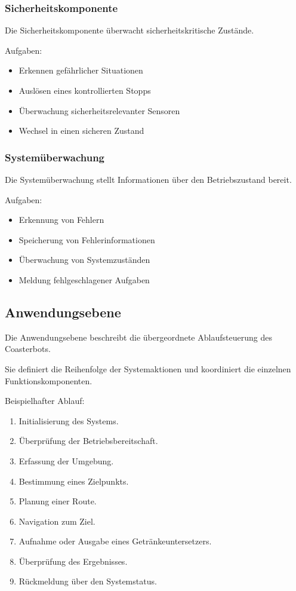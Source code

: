 \documentclass[
  a4paper,
  12pt,
  DIV=12,        %
  parskip=half,  %
  headings=small %
]{scrartcl}
\theoremstyle{definition}
\providecommand{\tightlist}{%
  \setlength{\itemsep}{0pt}\setlength{\parskip}{0pt}}
\theoremstyle{definition}
\begin{document}
\subsubsection{Sicherheitskomponente}\label{sicherheitskomponente}

Die Sicherheitskomponente überwacht sicherheitskritische Zustände.

Aufgaben:

\begin{itemize}
\tightlist
\item
  Erkennen gefährlicher Situationen
\item
  Auslösen eines kontrollierten Stopps
\item
  Überwachung sicherheitsrelevanter Sensoren
\item
  Wechsel in einen sicheren Zustand
\end{itemize}

\subsubsection{Systemüberwachung}\label{systemuxfcberwachung}

Die Systemüberwachung stellt Informationen über den Betriebszustand
bereit.

Aufgaben:

\begin{itemize}
\tightlist
\item
  Erkennung von Fehlern
\item
  Speicherung von Fehlerinformationen
\item
  Überwachung von Systemzuständen
\item
  Meldung fehlgeschlagener Aufgaben
\end{itemize}

\subsection{Anwendungsebene}\label{anwendungsebene}

Die Anwendungsebene beschreibt die übergeordnete Ablaufsteuerung des
Coasterbots.

Sie definiert die Reihenfolge der Systemaktionen und koordiniert die
einzelnen Funktionskomponenten.

Beispielhafter Ablauf:

\begin{enumerate}
\def\labelenumi{\arabic{enumi}.}
\tightlist
\item
  Initialisierung des Systems.
\item
  Überprüfung der Betriebsbereitschaft.
\item
  Erfassung der Umgebung.
\item
  Bestimmung eines Zielpunkts.
\item
  Planung einer Route.
\item
  Navigation zum Ziel.
\item
  Aufnahme oder Ausgabe eines Getränkeuntersetzers.
\item
  Überprüfung des Ergebnisses.
\item
  Rückmeldung über den Systemstatus.
\end{enumerate}
\end{document}
